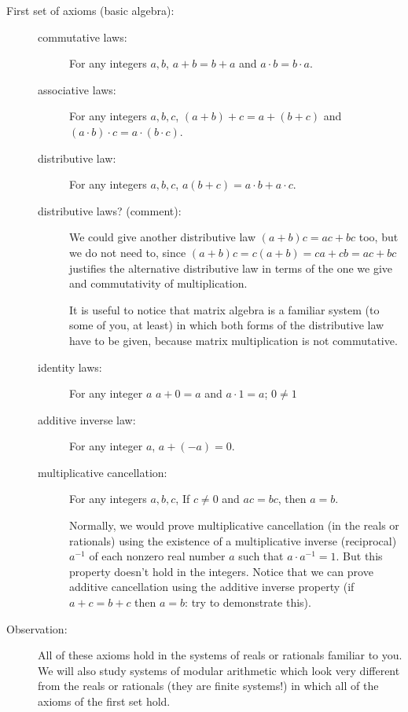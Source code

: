 \documentclass[12pt]{article}
\begin{document}
\begin{description}

\item[First set of axioms (basic algebra):]

\begin{description}

\item[commutative laws:]  For any integers $a,b$, $a+b=b+a$ and $a\cdot b = b \cdot a$.

\item[associative laws:]  For any integers $a,b,c$, $(a+b)+c = a +(b+c)$ and $(a \cdot b) \cdot c = a \cdot (b \cdot c)$.

\item[distributive law:]  For any integers $a,b,c$, $a(b+c) = a\cdot b + a\cdot c$.

\item[distributive laws?  (comment):]  We could give another distributive law $(a+b)c = ac+bc$ too, but we do not need to, since $(a+b)c = c(a+b) = ca+cb = ac+bc$ justifies the alternative distributive law in terms of the one we give and commutativity of multiplication.

It is useful to notice that matrix algebra is a familiar system (to some of you, at least) in which both forms of the distributive law have to be given, because matrix multiplication is not commutative.

\item[identity laws:]  For any integer $a$ $a+0=a$ and $a \cdot 1 = a$; $0 \neq 1$

\item[additive inverse law:]  For any integer $a$, $a+(-a)=0$.

\item[multiplicative cancellation:]  For any integers $a,b,c$, If $c \neq 0$ and $ac=bc$, then $a=b$.

Normally, we would prove multiplicative cancellation (in the reals or rationals) using the existence of a multiplicative inverse (reciprocal)
$a^{-1}$ of each nonzero real number $a$ such that $a \cdot a^{-1}=1$.  But this property doesn't hold in the integers.
Notice that we can prove additive cancellation using the additive inverse property (if $a+c = b+c$ then $a=b$:  try to demonstrate this).

\end{description}

\item[Observation:]  All of these axioms hold in the systems of reals or rationals familiar to you.  We will also 
study systems of modular arithmetic which look very different from the reals or rationals (they are finite systems!) in which all of the axioms of the first set hold.


\end{description}
\end{document}
